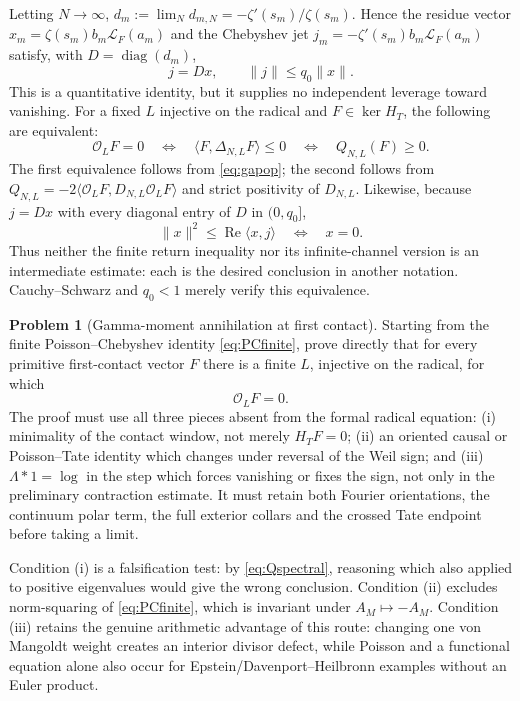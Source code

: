 \documentclass[11pt]{amsart}
\theoremstyle{definition}
\newtheorem{problem}[theorem]{Problem}
\theoremstyle{remark}
\newcommand{\Rel}{\operatorname{Re}}
\begin{document}
Letting $N\to\infty$, $d_m:=\lim_Nd_{m,N}=-\zeta'(s_m)/\zeta(s_m)$. Hence the residue vector
$x_m=\zeta(s_m)b_m\mathcal L_F(a_m)$ and the Chebyshev jet $j_m=-\zeta'(s_m)b_m\mathcal L_F(a_m)$ satisfy, with
$D=\operatorname{diag}(d_m)$,
\begin{equation}\label{eq:smallgain}
 j=D x,\qquad \|j\|\le q_0\|x\|.
\end{equation}
This is a quantitative identity, but it supplies no independent leverage toward vanishing.  For a
fixed $L$ injective on the radical and $F\in\ker H_T$, the following are equivalent:
\begin{equation}\label{eq:equivgate}
 \mathcal O_LF=0
 \quad\Longleftrightarrow\quad
 \langle F,\Delta_{N,L}F\rangle\le0
 \quad\Longleftrightarrow\quad
 Q_{N,L}(F)\ge0.
\end{equation}
The first equivalence follows from \eqref{eq:gapop}; the second follows from
$Q_{N,L}=-2\langle \mathcal O_LF,D_{N,L}\mathcal O_LF\rangle$ and strict positivity of $D_{N,L}$.
Likewise, because $j=Dx$ with every diagonal entry of $D$ in $(0,q_0]$,
\[
 \|x\|^2\le\Rel\langle x,j\rangle\quad\Longleftrightarrow\quad x=0.
\]
Thus neither the finite return inequality nor its infinite-channel version is an intermediate
estimate: each is the desired conclusion in another notation.  Cauchy--Schwarz and $q_0<1$ merely
verify this equivalence.

\begin{problem}[Gamma-moment annihilation at first contact]\label{prob:annihilate}
Starting from the finite Poisson--Chebyshev identity \eqref{eq:PCfinite}, prove directly that for every primitive first-contact
vector $F$ there is a finite $L$, injective on the radical, for which
\begin{equation}\label{eq:annihilate}
 \mathcal O_LF=0.
\end{equation}
The proof must use all three pieces absent from the formal radical equation: (i) minimality of the
contact window, not merely $H_TF=0$; (ii) an oriented causal or Poisson--Tate identity which changes
under reversal of the Weil sign; and (iii) $\Lambda*1=\log$ in the step which forces vanishing or
fixes the sign, not only in the preliminary contraction estimate.  It must retain both Fourier
orientations, the continuum polar term, the full exterior collars and the crossed Tate endpoint
before taking a limit.
\end{problem}

Condition (i) is a falsification test: by \eqref{eq:Qspectral}, reasoning which also applied to
positive eigenvalues would give the wrong conclusion.  Condition (ii) excludes norm-squaring of
\eqref{eq:PCfinite}, which is invariant under $A_M\mapsto-A_M$.  Condition (iii) retains the genuine
arithmetic advantage of this route: changing one von Mangoldt weight creates an interior divisor
defect, while Poisson and a functional equation alone also occur for Epstein/Davenport--Heilbronn
examples without an Euler product.
\end{document}
